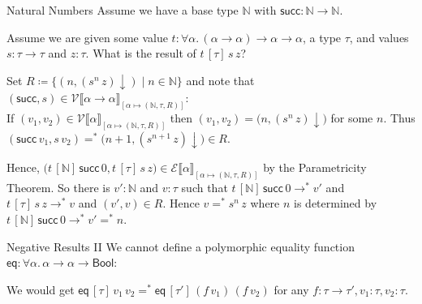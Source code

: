 \documentclass{beamer}
\newcommand{\denot}[1]{\llbracket#1\rrbracket}
\newcommand{\vint}[1]{\mathcal{V}\denot{#1}}
\newcommand{\tint}[1]{\mathcal{E}\denot{#1}}
\newcommand{\bool}{\mathsf{Bool}}
\newcommand{\suc}{\mathsf{succ}}
\newcommand{\eq}{\mathsf{eq}}
\newcommand{\nf}[1]{#1{\downarrow}}
\newcommand{\eqnf}{=^*}
\begin{document}
\begin{frame}{Natural Numbers}
Assume we have a base type $\mathbb{N}$ with $\suc : \mathbb{N}\to\mathbb{N}$.

\pause
Assume we are given some value $t : \forall \alpha.\, (\alpha\to\alpha)\to\alpha\to\alpha$, a type $\tau$, and values $s : \tau\to\tau$ and $z : \tau$.
What is the result of $t\,[\tau]\,s\,z$?

\pause
Set $R\coloneqq \bigl\{(n,\nf{(s^n\, z)})\mid n\in\mathbb{N}\bigr\}$ and note that $(\suc, s)\in\vint{\alpha\to\alpha}_{[\alpha\mapsto(\mathbb{N},\tau,R)]}$:\\
\pause If $(v_1,v_2)\in\vint{\alpha}_{[\alpha\mapsto(\mathbb{N},\tau,R)]}$
then $(v_1,v_2)=\bigl(n,\nf{(s^n\, z)}\bigr)$ for some $n$.
Thus $(\suc\,v_1,s\,v_2)\eqnf\bigl(n+1,\nf{(s^{n+1}\, z)}\bigr)\in R$.

\pause
Hence, $\bigl(t\,[\mathbb{N}]\,\suc\, 0,t\,[\tau]\,s\,z\bigr)\in\tint{\alpha}_{[\alpha\mapsto(\mathbb{N},\tau,R)]}$ by the Parametricity Theorem.
\pause So there is $v' : \mathbb{N}$ and $v : \tau$ such that
$t\,[\mathbb{N}]\,\suc\, 0\to^*v'$ and $t\,[\tau]\,s\,z\to^*v$ and $(v',v)\in R$.
\pause Hence $v \eqnf s^n\, z$ where $n$ is determined by $t\,[\mathbb{N}]\,\suc\, 0\to^*v'\eqnf n$.
\end{frame}

\begin{frame}{Negative Results II}
We cannot define a polymorphic equality function $\eq : \forall \alpha.\, \alpha\to\alpha\to\bool$:

We would get $\eq\,[\tau]\,v_1\,v_2 \eqnf \eq\,[\tau']\,(f\,v_1)\,(f\,v_2)$ for any $f : \tau\to\tau',v_1 : \tau,v_2 : \tau$.
\end{frame}
\end{document}
